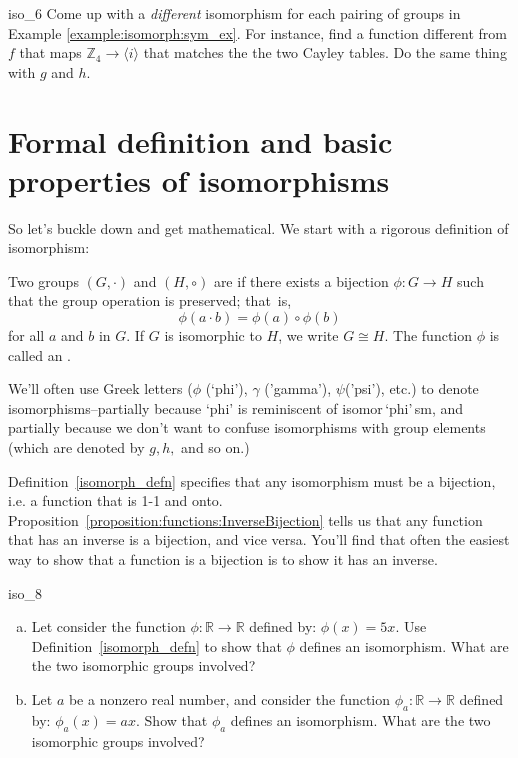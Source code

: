  \begin{exercise}{iso_6}
 Come up with a \emph{different} isomorphism for each pairing of groups in Example \ref{example:isomorph:sym_ex}. For instance, find a  function  different from $f$ that maps ${\mathbb Z_4} \longrightarrow \langle i \rangle$  that matches the the two Cayley tables. Do the same thing with $g$ and $h$.
 \end{exercise}
  
\section{Formal definition and basic properties of isomorphisms}
\label{sec:Isomorphism:FormalDefinition}

So let's buckle down and get mathematical. We start with a rigorous definition of isomorphism:

\begin{defn}\label{isomorph_defn}
Two groups $(G, \cdot)$ and $(H, \circ)$ are  if there exists a bijection $\phi : G \rightarrow H$ such that the group operation is preserved;  that~is, 
\[
\phi( a \cdot b) = \phi( a) \circ \phi( b)
\]
for all $a$ and $b$ in $G$. If $G$ is isomorphic to $H$, we write $G \cong H$. The function $\phi$ is called an . 
\end{defn}

\begin{rem}
We'll often use Greek letters ($\phi$ (`phi'), $\gamma$ ('gamma'), $\psi$('psi'), etc.) to denote isomorphisms--partially because `phi' is reminiscent of isomor$\,$`phi'$\,$sm, and partially because we don't want to confuse isomorphisms with group elements  (which are denoted by $g,h,$ and so on.)
\end{rem}

\begin{rem}
Definition~\ref{isomorph_defn} specifies that any isomorphism must be a bijection, i.e. a function that is 1-1 and onto.  Proposition~\ref{proposition:functions:InverseBijection} tells us that any function that has an inverse is a bijection, and vice versa. You'll find that often the easiest way to show that a function is a bijection is to show it has an inverse.   
\end{rem}


\begin{exercise}{iso_8}
\begin{enumerate}[(a)]
\item
Let consider the function $\phi : \mathbb{R} \rightarrow \mathbb{R}$ defined by:  $\phi(x) = 5x$.  Use Definition~\ref{isomorph_defn} to show that $\phi$ defines an isomorphism. What are the two isomorphic groups involved?
\item
Let $a$ be a nonzero real number, and consider the function $\phi_a : \mathbb{R} \rightarrow \mathbb{R}$ defined by:  $\phi_a(x) = ax$.  Show that $\phi_a$ defines an isomorphism. What are the two isomorphic groups involved?
\end{enumerate}
\end{exercise}

